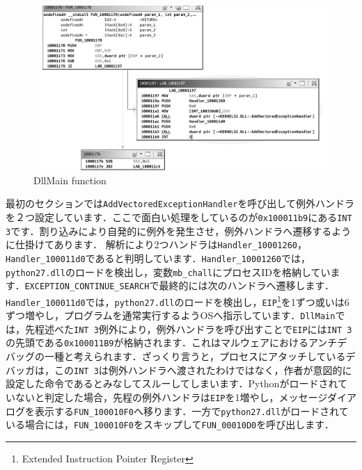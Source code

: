 \begin{figure}[H]
    \centering
    \includegraphics[width=\linewidth]{./assets/takuzoo3868asset/ghidra_002_gray.png}
    \caption{DllMain function}
    \label{fig:ghdra_002}
\end{figure}
最初のセクションでは\texttt{AddVectoredExceptionHandler}を呼び出して例外ハンドラを２つ設定しています．ここで面白い処理をしているのが\texttt{0x100011b9}にある\texttt{INT 3}です．割り込みにより自発的に例外を発生させ，例外ハンドラへ遷移するように仕掛けてあります． 解析により2つハンドラは\texttt{Handler\_10001260}，\texttt{Handler\_100011d0}であると判明しています．\texttt{Handler\_10001260}では，\texttt{python27.dll}のロードを検出し，変数\texttt{mb\_chall}にプロセスIDを格納しています．\texttt{EXCEPTION\_CONTINUE\_SEARCH}で最終的には次のハンドラへ遷移します．\texttt{Handler\_100011d0}では，\texttt{python27.dll}のロードを検出し，\texttt{EIP}\footnote{Extended Instruction Pointer Register}を1ずつ或いは6ずつ増やし，プログラムを通常実行するようOSへ指示しています．\texttt{DllMain}では，先程述べた\texttt{INT 3}例外により，例外ハンドラを呼び出すことで\texttt{EIP}には\texttt{INT 3}の先頭である\texttt{0x100011B9}が格納されます．これはマルウェアにおけるアンチデバッグの一種と考えられます．ざっくり言うと，プロセスにアタッチしているデバッガは，この\texttt{INT 3}は例外ハンドラへ渡されたわけではなく，作者が意図的に設定した命令であるとみなしてスルーしてしまいます．Pythonがロードされていないと判定した場合，先程の例外ハンドラは\texttt{EIP}を1増やし，メッセージダイアログを表示する\texttt{FUN\_100010F0}へ移ります．一方で\texttt{python27.dll}がロードされている場合には，\texttt{FUN\_100010F0}をスキップして\texttt{FUN\_00010D0}を呼び出します．
